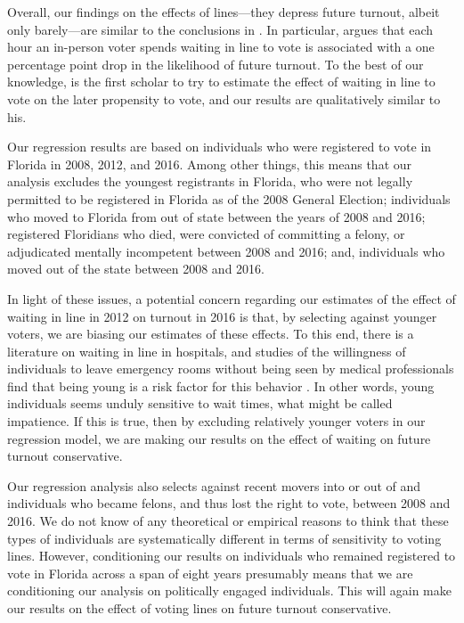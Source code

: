 \documentclass[12pt,titlepage]{article}
\begin{document}
Overall, our findings on the effects of lines---they depress future
turnout, albeit only barely---are similar to the conclusions in
\citet{pettigrew:longlinesminorityprecincts}.  In particular,
\citeauthor{pettigrew:longlinesminorityprecincts} argues that each
hour an in-person voter spends waiting in line to vote is associated
with a one percentage point drop in the likelihood of future turnout.
To the best of our knowledge,
\citeauthor{pettigrew:longlinesminorityprecincts} is the first scholar
to try to estimate the effect of waiting in line to vote on the later
propensity to vote, and our results are qualitatively similar to his.

Our regression results are based on individuals who were registered to
vote in Florida in 2008, 2012, and 2016.  Among other things, this
means that our analysis excludes the youngest registrants in Florida,
who were not legally permitted to be registered in Florida as of the
2008 General Election; individuals who moved to Florida from out of
state between the years of 2008 and 2016; registered Floridians who
died, were convicted of committing a felony, or adjudicated mentally
incompetent between 2008 and 2016; and, individuals who moved out of
the state between 2008 and 2016.

In light of these issues, a potential concern regarding our estimates
of the effect of waiting in line in 2012 on turnout in 2016 is that,
by selecting against younger voters, we are biasing our estimates of
these effects. To this end, there is a literature on waiting in line
in hospitals, and studies of the willingness of individuals to leave
emergency rooms without being seen by medical professionals find that
being young is a risk factor for this behavior
\citep{sunetal:lwbs,clareycooke:emergencyroomleave,shaikh:howlongwaiter}.
In other words, young individuals seems unduly sensitive to wait
times, what might be called impatience.  If this is true, then by
excluding relatively younger voters in our regression model, we are
making our results on the effect of waiting on future turnout
conservative.

Our regression analysis also selects against recent movers into or out
of and individuals who became felons, and thus lost the right to vote,
between 2008 and 2016.  We do not know of any theoretical or empirical
reasons to think that these types of individuals are systematically
different in terms of sensitivity to voting lines.  However,
conditioning our results on individuals who remained registered to
vote in Florida across a span of eight years presumably means that we
are conditioning our analysis on politically engaged individuals.
This will again make our results on the effect of voting lines on
future turnout conservative.
\end{document}
